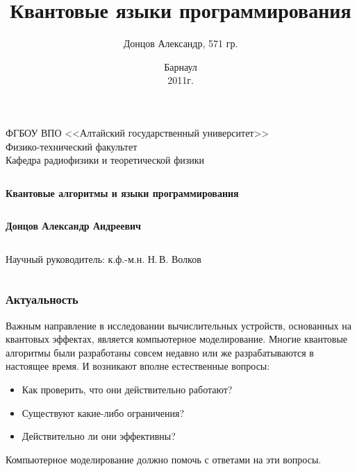 \documentclass{beamer}
\begin{document}
\title{Квантовые языки программирования}  
\author[Донцов А.]{Донцов Александр, 571 гр.}


\date{
   Барнаул\\
    2011г.
}
\begin{frame}
\begin{block}{}
\begin{center}
ФГБОУ ВПО <<Алтайский государственный университет>>\\
Физико-технический факультет\\
Кафедра радиофизики и теоретической физики
\end{center}
\end{block}
  \begin{columns}
      \begin{block}{}
	\begin{flushleft}
	  {{\Large \bf Квантовые алгоритмы и языки программирования\\}}
	\end{flushleft}
      \end{block}
  \end{columns}
\begin{center}
\textbf{Донцов Александр Андреевич}
\end{center}
  \begin{columns}
      \begin{flushright}
      \end{flushright}
  \end{columns}

  \begin{columns}
      \begin{flushright}
	Научный руководитель: к.ф.-м.н. Н.\,В. Волков\\
      \end{flushright}
  \end{columns}
\end{frame}
\begin{frame}
 \frametitle{Актуальность}
Важным направление в исследовании вычислительных устройств, основанных на квантовых эффектах,  является компьютерное моделирование.  Многие квантовые алгоритмы были разработаны совсем недавно или же разрабатываются в настоящее время. И возникают вполне естественные вопросы:
  
\begin{itemize}
  \item Как проверить, что они действительно работают? 
 
  \item Существуют какие-либо ограничения? 

  \item Действительно ли они эффективны? 
\end{itemize}
Компьютерное моделирование должно помочь с ответами на эти вопросы. 
\end{frame}
\end{document}
